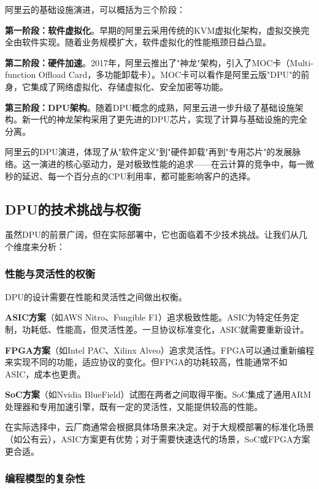 阿里云的基础设施演进，可以概括为三个阶段：

\textbf{第一阶段：软件虚拟化}。早期的阿里云采用传统的KVM虚拟化架构，虚拟交换完全由软件实现。随着业务规模扩大，软件虚拟化的性能瓶颈日益凸显。

\textbf{第二阶段：硬件加速}。2017年，阿里云推出了"神龙"架构，引入了MOC卡（Multi-function Offload Card，多功能卸载卡）。MOC卡可以看作是阿里云版"DPU"的前身，它集成了网络虚拟化、存储虚拟化、安全加密等功能。

\textbf{第三阶段：DPU架构}。随着DPU概念的成熟，阿里云进一步升级了基础设施架构。新一代的神龙架构采用了更先进的DPU芯片，实现了计算与基础设施的完全分离。

阿里云的DPU演进，体现了从"软件定义"到"硬件卸载"再到"专用芯片"的发展脉络。这一演进的核心驱动力，是对极致性能的追求——在云计算的竞争中，每一微秒的延迟、每一个百分点的CPU利用率，都可能影响客户的选择。

\subsection{DPU的技术挑战与权衡}

虽然DPU的前景广阔，但在实际部署中，它也面临着不少技术挑战。让我们从几个维度来分析：

\subsubsection{性能与灵活性的权衡}

DPU的设计需要在性能和灵活性之间做出权衡。

\textbf{ASIC方案}（如AWS Nitro、Fungible F1）追求极致性能。ASIC为特定任务定制，功耗低、性能高，但灵活性差。一旦协议标准变化，ASIC就需要重新设计。

\textbf{FPGA方案}（如Intel PAC、Xilinx Alveo）追求灵活性。FPGA可以通过重新编程来实现不同的功能，适应协议的变化。但FPGA的功耗较高，性能通常不如ASIC，成本也更贵。

\textbf{SoC方案}（如Nvidia BlueField）试图在两者之间取得平衡。SoC集成了通用ARM处理器和专用加速引擎，既有一定的灵活性，又能提供较高的性能。

在实际选择中，云厂商通常会根据具体场景来决定。对于大规模部署的标准化场景（如公有云），ASIC方案更有优势；对于需要快速迭代的场景，SoC或FPGA方案更合适。

\subsubsection{编程模型的复杂性}

